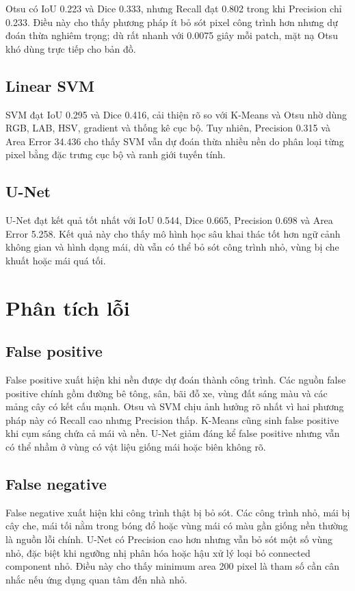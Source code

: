 \documentclass[12pt,a4paper]{report}
\begin{document}
Otsu có IoU 0.223 và Dice 0.333, nhưng Recall đạt 0.802 trong khi Precision chỉ 0.233. Điều này cho thấy phương pháp ít bỏ sót pixel công trình hơn nhưng dự đoán thừa nghiêm trọng; dù rất nhanh với 0.0075 giây mỗi patch, mặt nạ Otsu khó dùng trực tiếp cho bản đồ.

\subsection{Linear SVM}

SVM đạt IoU 0.295 và Dice 0.416, cải thiện rõ so với K-Means và Otsu nhờ dùng RGB, LAB, HSV, gradient và thống kê cục bộ. Tuy nhiên, Precision 0.315 và Area Error 34.436 cho thấy SVM vẫn dự đoán thừa nhiều nền do phân loại từng pixel bằng đặc trưng cục bộ và ranh giới tuyến tính.

\subsection{U-Net}

U-Net đạt kết quả tốt nhất với IoU 0.544, Dice 0.665, Precision 0.698 và Area Error 5.258. Kết quả này cho thấy mô hình học sâu khai thác tốt hơn ngữ cảnh không gian và hình dạng mái, dù vẫn có thể bỏ sót công trình nhỏ, vùng bị che khuất hoặc mái quá tối.

\section{Phân tích lỗi}

\subsection{False positive}

False positive xuất hiện khi nền được dự đoán thành công trình. Các nguồn false positive chính gồm đường bê tông, sân, bãi đỗ xe, vùng đất sáng màu và các mảng cây có kết cấu mạnh. Otsu và SVM chịu ảnh hưởng rõ nhất vì hai phương pháp này có Recall cao nhưng Precision thấp. K-Means cũng sinh false positive khi cụm sáng chứa cả mái và nền. U-Net giảm đáng kể false positive nhưng vẫn có thể nhầm ở vùng có vật liệu giống mái hoặc biên không rõ.

\subsection{False negative}

False negative xuất hiện khi công trình thật bị bỏ sót. Các công trình nhỏ, mái bị cây che, mái tối nằm trong bóng đổ hoặc vùng mái có màu gần giống nền thường là nguồn lỗi chính. U-Net có Precision cao hơn nhưng vẫn bỏ sót một số vùng nhỏ, đặc biệt khi ngưỡng nhị phân hóa hoặc hậu xử lý loại bỏ connected component nhỏ. Điều này cho thấy minimum area 200 pixel là tham số cần cân nhắc nếu ứng dụng quan tâm đến nhà nhỏ.
\end{document}
